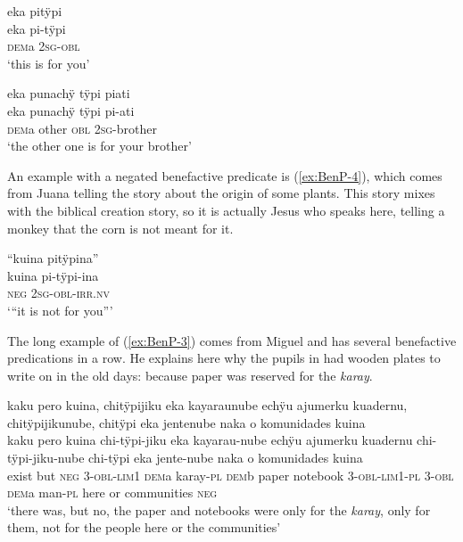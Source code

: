 \ea\label{ex:BenP-1}
\begingl 
\glpreamble eka pitÿpi\\
\gla eka pi-tÿpi\\ 
\glb \textsc{dem}a 2\textsc{sg}-\textsc{obl}\\ 
\glft ‘this is for you’\\ 
\endgl
\trailingcitation{[jmx-e090727s.067]}
\xe

\ea\label{ex:BenP-2}
\begingl
\glpreamble eka punachÿ tÿpi piati\\
\gla eka punachÿ tÿpi pi-ati\\
\glb \textsc{dem}a other \textsc{obl} 2\textsc{sg}-brother\\
\glft ‘the other one is for your brother’
\endgl
\trailingcitation{[jmx-e090727s.063]}
\xe

An example with a negated benefactive predicate is (\ref{ex:BenP-4}), which comes from Juana telling the story about the origin of some plants. This story mixes with the biblical creation story, so it is actually Jesus who speaks here, telling a monkey that the corn is not meant for it.

\ea\label{ex:BenP-4}
\begingl
\glpreamble “kuina pitÿpina”\\
\gla kuina pi-tÿpi-ina\\
\glb \textsc{neg} 2\textsc{sg}-\textsc{obl}-\textsc{irr.nv}\\
\glft ‘“it is not for you”’
\endgl
\trailingcitation{[jxx-n101013s-1.872]}
\xe

The long example of (\ref{ex:BenP-3}) comes from Miguel and has several benefactive predications in a row. He explains here why the pupils in  had wooden plates to write on in the old days: because paper was reserved for the \textit{karay}.

\ea\label{ex:BenP-3}
\begingl
\glpreamble kaku pero kuina, chitÿpijiku eka kayaraunube echÿu ajumerku kuadernu, \\chitÿpijikunube, chitÿpi eka jentenube naka o komunidades kuina\\
\gla kaku pero kuina chi-tÿpi-jiku eka kayarau-nube echÿu ajumerku kuadernu chi-tÿpi-jiku-nube chi-tÿpi eka jente-nube naka o komunidades kuina\\
\glb exist but \textsc{neg} 3-\textsc{obl}-\textsc{lim}1 \textsc{dem}a karay-\textsc{pl} \textsc{dem}b paper notebook 3-\textsc{obl}-\textsc{lim}1-\textsc{pl} 3-\textsc{obl} \textsc{dem}a man-\textsc{pl} here or communities \textsc{neg}\\
\glft ‘there was, but no, the paper and notebooks were only for the \textit{karay}, only for them, not for the people here or the communities’
\endgl
\trailingcitation{[mxx-p181027l-1.027-029]}
\xe

